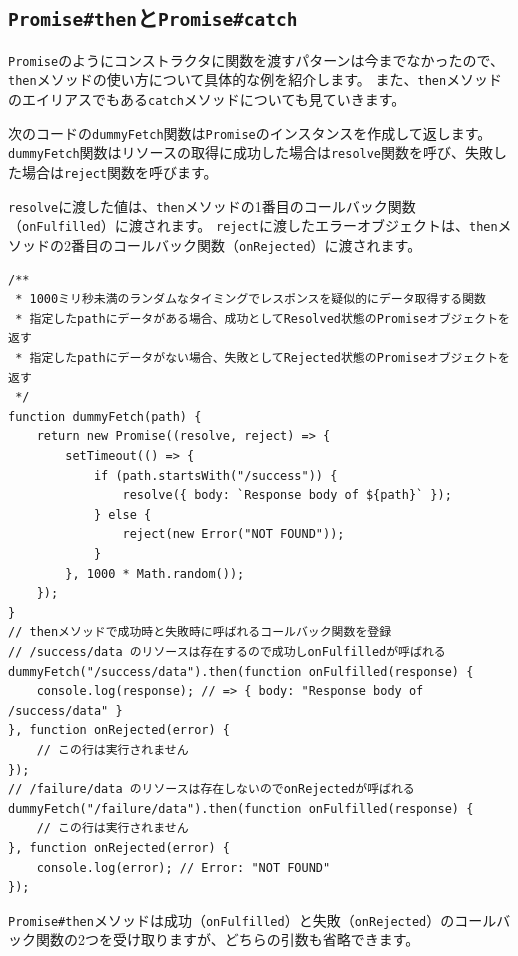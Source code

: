 \hypertarget{promise-then-and-catch}{%
\subsection{\texorpdfstring{\texttt{Promise\#then}と\texttt{Promise\#catch}}{Promise\#thenとPromise\#catch}}\label{promise-then-and-catch}}

\texttt{Promise}のようにコンストラクタに関数を渡すパターンは今までなかったので、\texttt{then}メソッドの使い方について具体的な例を紹介します。
また、\texttt{then}メソッドのエイリアスでもある\texttt{catch}メソッドについても見ていきます。

次のコードの\texttt{dummyFetch}関数は\texttt{Promise}のインスタンスを作成して返します。
\texttt{dummyFetch}関数はリソースの取得に成功した場合は\texttt{resolve}関数を呼び、失敗した場合は\texttt{reject}関数を呼びます。

\texttt{resolve}に渡した値は、\texttt{then}メソッドの1番目のコールバック関数（\texttt{onFulfilled}）に渡されます。
\texttt{reject}に渡したエラーオブジェクトは、\texttt{then}メソッドの2番目のコールバック関数（\texttt{onRejected}）に渡されます。

\begin{lstlisting}
/**
 * 1000ミリ秒未満のランダムなタイミングでレスポンスを疑似的にデータ取得する関数
 * 指定したpathにデータがある場合、成功としてResolved状態のPromiseオブジェクトを返す
 * 指定したpathにデータがない場合、失敗としてRejected状態のPromiseオブジェクトを返す
 */
function dummyFetch(path) {
    return new Promise((resolve, reject) => {
        setTimeout(() => {
            if (path.startsWith("/success")) {
                resolve({ body: `Response body of ${path}` });
            } else {
                reject(new Error("NOT FOUND"));
            }
        }, 1000 * Math.random());
    });
}
// thenメソッドで成功時と失敗時に呼ばれるコールバック関数を登録
// /success/data のリソースは存在するので成功しonFulfilledが呼ばれる
dummyFetch("/success/data").then(function onFulfilled(response) {
    console.log(response); // => { body: "Response body of /success/data" }
}, function onRejected(error) {
    // この行は実行されません
});
// /failure/data のリソースは存在しないのでonRejectedが呼ばれる
dummyFetch("/failure/data").then(function onFulfilled(response) {
    // この行は実行されません
}, function onRejected(error) {
    console.log(error); // Error: "NOT FOUND"
});
\end{lstlisting}

\texttt{Promise\#then}メソッドは成功（\texttt{onFulfilled}）と失敗（\texttt{onRejected}）のコールバック関数の2つを受け取りますが、どちらの引数も省略できます。

